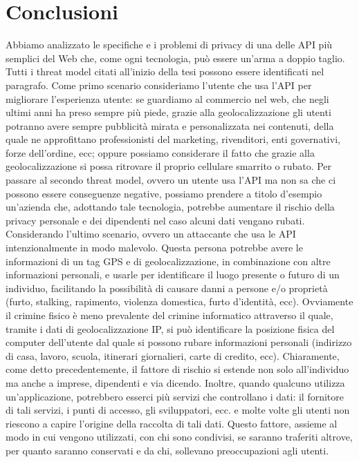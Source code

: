 \documentclass[11pt ,a4paper , twoside , openright ]{book}
\begin{document}
	\section{Conclusioni}
	Abbiamo analizzato le specifiche e i problemi di privacy di una delle API più semplici del Web che, come ogni tecnologia, può essere un'arma a doppio taglio. 
	Tutti i threat model citati all'inizio della tesi possono essere identificati nel paragrafo.
	Come primo scenario consideriamo l'utente che usa l'API per migliorare l'esperienza utente: se guardiamo al commercio nel web, che negli ultimi anni ha preso sempre più piede, grazie alla geolocalizzazione gli utenti potranno avere sempre pubblicità mirata e personalizzata nei contenuti, della quale ne approfittano professionisti del marketing, rivenditori, enti governativi, forze dell'ordine, ecc; oppure possiamo considerare il fatto che grazie alla geolocalizzazione si possa ritrovare il proprio cellulare smarrito o rubato.
	Per passare al secondo threat model, ovvero un utente usa l'API ma non sa che ci possono essere conseguenze negative, possiamo prendere a titolo d'esempio un'azienda che, adottando tale tecnologia, potrebbe aumentare il rischio della privacy personale e dei dipendenti nel caso alcuni dati vengano rubati. 
	Considerando l'ultimo scenario, ovvero un attaccante che usa le API intenzionalmente in modo malevolo. Questa persona potrebbe avere le informazioni di un tag GPS e di geolocalizzazione, in combinazione con altre informazioni personali, e usarle per identificare il luogo presente o futuro di un individuo, facilitando la possibilità di causare danni a persone e/o proprietà (furto, stalking, rapimento, violenza domestica, furto d'identità, ecc). Ovviamente il crimine fisico è meno prevalente del crimine informatico attraverso il quale, tramite i dati di geolocalizzazione IP, si può identificare la posizione fisica del computer dell'utente dal quale si possono rubare informazioni personali (indirizzo di casa, lavoro, scuola, itinerari giornalieri, carte di credito, ecc). Chiaramente, come detto precedentemente, il fattore di rischio si estende non solo all'individuo ma anche a imprese, dipendenti e via dicendo.
	Inoltre, quando qualcuno utilizza un'applicazione, potrebbero esserci più servizi che controllano i dati: il fornitore di tali servizi, i punti di accesso, gli sviluppatori, ecc. e molte volte gli utenti non riescono a capire l'origine della raccolta di tali dati. 
	Questo fattore, assieme al modo in cui vengono utilizzati, con chi sono condivisi, se saranno traferiti altrove, per quanto saranno conservati e da chi, sollevano preoccupazioni agli utenti. 
\end{document}
